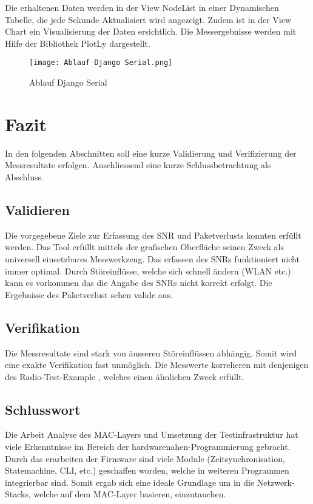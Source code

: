 Die erhaltenen Daten werden in der View Node\textunderscore List in einer Dynamischen Tabelle, die jede Sekunde Aktualisiert wird angezeigt. Zudem ist in der View Chart ein Visualisierung der Daten ersichtlich. Die Messergebnisse werden mit Hilfe der Bibliothek PlotLy dargestellt. \\

\begin{figure} [H]
	\centering
	\texttt{[image: Ablauf Django Serial.png]}
	\caption{Ablauf Django Serial}
	\label{fig:AblaufDjangoSerial}
\end{figure}


\section{Fazit}\label{sec:FazitP2P}

In den folgenden Abschnitten soll eine kurze Validierung und Verifizierung der Messresultate erfolgen. Anschliessend eine kurze Schlussbetrachtung als Abschluss. 

\subsection{Validieren}\label{subsec:ValidierenP2P}

Die vorgegebene Ziele zur Erfassung des SNR und Paketverlusts konnten erfüllt werden. Das Tool erfüllt mittels der grafischen Oberfläche seinen Zweck als universell einsetzbares Messwerkzeug. Das erfassen des SNRs funktioniert nicht immer optimal. Durch Störeinflüsse, welche sich schnell ändern (WLAN etc.) kann es vorkommen das die Angabe des SNRs nicht korrekt erfolgt. Die Ergebnisse des Paketverlust sehen valide aus. 

\subsection{Verifikation}\label{subsec:VerifikationP2P}

Die Messresultate sind stark von äusseren Störeinflüssen abhängig. Somit wird eine exakte Verifikation fast unmöglich. Die Messwerte korrelieren mit denjenigen des Radio-Test-Example \cite{nrf_connect_sdk_radio_test_example_2020}, welches einen ähnlichen Zweck erfüllt. 

\subsection{Schlusswort}\label{subsec:SchlusswortP2P}

Die Arbeit Analyse des MAC-Layers und Umsetzung der Testinfrastruktur hat viele Erkenntnisse im Bereich der hardwarenahen-Programmierung gebracht. Durch das erarbeiten der Firmware sind viele Module (Zeitsynchronisation, Statemachine, CLI, etc.) geschaffen worden, welche in weiteren Programmen integrierbar sind. Somit ergab sich eine ideale Grundlage um in die Netzwerk-Stacks, welche auf dem MAC-Layer basieren, einzutauchen. 

